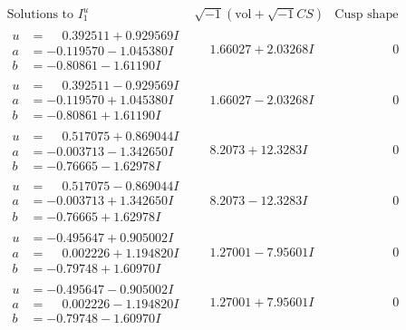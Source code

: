 \documentclass[1p]{elsarticle_modified}
\theoremstyle{definition}
\newcommand{\I}{\sqrt{-1}}
\begin{document}
$$\begin{array}{c|c|c}  
\text{Solutions to }I^u_{1}& \I (\text{vol} + \sqrt{-1}CS) & \text{Cusp shape}\\
 \hline 
\begin{aligned}
u &= \phantom{-}0.392511 + 0.929569 I \\
a &= -0.119570 - 1.045380 I \\
b &= -0.80861 - 1.61190 I\end{aligned}
 & \phantom{-}1.66027 + 2.03268 I & \phantom{-0.000000 } 0 \\ \hline\begin{aligned}
u &= \phantom{-}0.392511 - 0.929569 I \\
a &= -0.119570 + 1.045380 I \\
b &= -0.80861 + 1.61190 I\end{aligned}
 & \phantom{-}1.66027 - 2.03268 I & \phantom{-0.000000 } 0 \\ \hline\begin{aligned}
u &= \phantom{-}0.517075 + 0.869044 I \\
a &= -0.003713 - 1.342650 I \\
b &= -0.76665 - 1.62978 I\end{aligned}
 & \phantom{-}8.2073 + 12.3283 I & \phantom{-0.000000 } 0 \\ \hline\begin{aligned}
u &= \phantom{-}0.517075 - 0.869044 I \\
a &= -0.003713 + 1.342650 I \\
b &= -0.76665 + 1.62978 I\end{aligned}
 & \phantom{-}8.2073 - 12.3283 I & \phantom{-0.000000 } 0 \\ \hline\begin{aligned}
u &= -0.495647 + 0.905002 I \\
a &= \phantom{-}0.002226 + 1.194820 I \\
b &= -0.79748 + 1.60970 I\end{aligned}
 & \phantom{-}1.27001 - 7.95601 I & \phantom{-0.000000 } 0 \\ \hline\begin{aligned}
u &= -0.495647 - 0.905002 I \\
a &= \phantom{-}0.002226 - 1.194820 I \\
b &= -0.79748 - 1.60970 I\end{aligned}
 & \phantom{-}1.27001 + 7.95601 I & \phantom{-0.000000 } 0 \\ \hline\begin{aligned}

\end{aligned}
\end{array}$$
\end{document}
